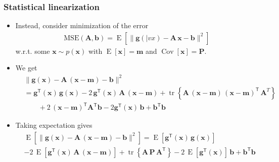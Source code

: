 \documentclass[first=dgreen,second=purple,presentation]{elecslides}
\newcommand{\mbf}[1]{\mathbf{#1}}
\newcommand{\T}[0]{\mathsf{T}}
\DeclareMathOperator{\tr}{tr}
\DeclareMathOperator{\Cov}{Cov}
\DeclareMathOperator{\E}{E}
\newcommand{\vb}{\mbf{b}}
\newcommand{\vg}{\mbf{g}}
\newcommand{\vm}{\mbf{m}}
\newcommand{\vx}{\mbf{x}}
\newcommand{\MA}{\mbf{A}}
\newcommand{\MP}{\mbf{P}}
\begin{document}
\begin{frame}
 \frametitle{Statistical linearization}

\begin{itemize}[<+->]
\item Instead, consider minimization of the error
%
\begin{equation}
\begin{split}
  \mathrm{MSE}(\MA,\vb) = \E\left[ \| \vg(|vx) - \MA \, \vx - \vb \|^2 \right]
\end{split}
\nonumber
\end{equation}
%
w.r.t. some $\vx \sim p(\vx)$ with $\E[\vx] = \vm$ and $\Cov[\vx] = \MP$.

\item We get
%
\begin{equation}
\begin{split}
  &\| \vg(\vx) - \MA \, (\vx - \vm) - \vb\|^2 \\
  &= \vg^\T(\vx)\, \vg(\vx) 
  - 2 \, \vg^\T(\vx) \, \MA \, (\vx - \vm) + \tr \left\{ \MA \, (\vx - \vm) \, (\vx - \vm)^\T \, \MA^T \right\} \\
  &\qquad + 2 \, (\vx - \vm)^\T \MA^\T \vb
    - 2 \vg^\T(\vx) \, \vb + \vb^\T \vb
\end{split}
\nonumber
\end{equation}

\item Taking expectation gives
%
\begin{equation}
\begin{split}
  &\E\left[ \| \vg(\vx) - \MA \, (\vx - \vm) - \vb\|^2 \right] 
  = \E\left[ \vg^\T(\vx) \, \vg(\vx)\right] \\
  &- 2 \, \E\left[ \vg^\T(\vx) \, \MA \, (\vx - \vm) \right] + \tr\left\{ \MA \, \MP \, \MA^\T \right\} 
  - 2 \, \E\left[ \vg^\T(\vx)\right] \, \vb + \vb^\T \vb
\end{split}
\nonumber
\end{equation}
%
\end{itemize}
\end{frame}
\end{document}
